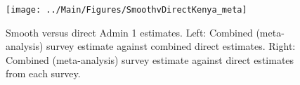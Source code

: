 \documentclass[12pt]{article}\usepackage[]{graphicx}\usepackage[]{color}
\newenvironment{knitrout}{}{} %
\begin{document}



\begin{knitrout}
\color{fgcolor}\begin{figure}[bht]

{\centering \texttt{[image: ../Main/Figures/SmoothvDirectKenya\_meta]} 

}

\caption[Smooth versus direct Admin 1 estimates]{Smooth versus direct Admin 1 estimates. Left: Combined (meta-analysis) survey estimate against combined direct estimates. Right: Combined (meta-analysis) survey estimate against direct estimates from each survey.}\label{fig:unnamed-chunk-163}
\end{figure}


\end{knitrout}
\end{document}
